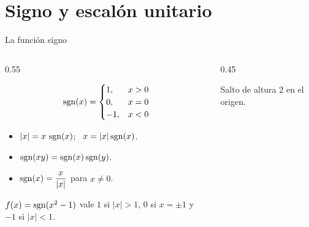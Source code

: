 \documentclass[10pt,aspectratio=169]{beamer}
\begin{document}
\section{Signo y escalón unitario}

\begin{frame}{La función signo}
  \begin{columns}
    \begin{column}{0.55\textwidth}
      \begin{definicion}
        \[ \operatorname{sgn}(x)=\begin{cases}1,&x>0\\0,&x=0\\-1,&x<0\end{cases} \]
      \end{definicion}
      \begin{proposicion}
        \begin{itemize}
          \item $|x|=x\,\operatorname{sgn}(x)$; \ $x=|x|\operatorname{sgn}(x)$.
          \item $\operatorname{sgn}(xy)=\operatorname{sgn}(x)\operatorname{sgn}(y)$.
          \item $\operatorname{sgn}(x)=\dfrac{x}{|x|}$ para $x\ne0$.
        \end{itemize}
      \end{proposicion}
      \begin{ejemplo}
        $f(x)=\operatorname{sgn}(x^2-1)$ vale $1$ si $|x|>1$, $0$ si $x=\pm1$ y $-1$ si $|x|<1$.
      \end{ejemplo}
    \end{column}
    \begin{column}{0.45\textwidth}
      \centering

      \small Salto de altura $2$ en el origen.
    \end{column}
  \end{columns}
\end{frame}
\end{document}
